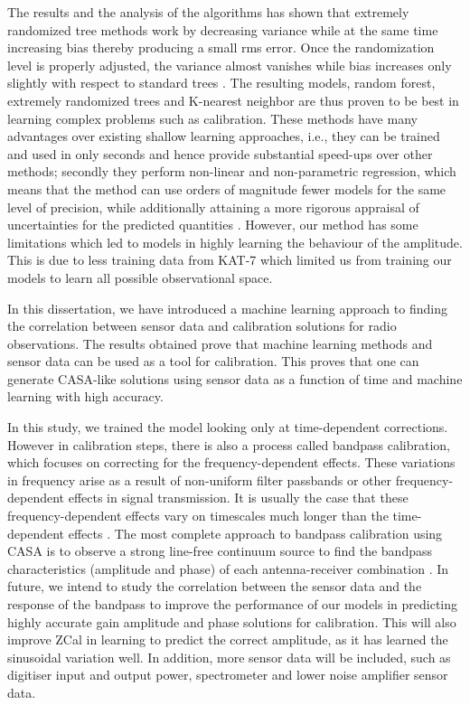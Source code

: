 The results and the analysis of the algorithms  has shown that extremely randomized tree methods work by decreasing variance while at the same time increasing bias thereby producing a small rms error. Once the randomization level is properly adjusted, the variance almost vanishes while bias increases only slightly with respect to standard trees \citep{geurts2006extremely}. The resulting models, random forest, extremely randomized trees and K-nearest neighbor are thus proven to be best in learning complex problems such as calibration. These methods have many advantages over
existing shallow learning approaches, i.e., they can be trained
and used in only seconds and hence provide substantial
speed-ups over other methods; secondly they perform non-linear and non-parametric regression, which means that the method can
use orders of magnitude fewer models for the same level
of precision, while additionally attaining a more rigorous
appraisal of uncertainties for the predicted quantities \citep{bellinger2016fundamental}. However, our method has some limitations which led to models in highly learning the behaviour of the amplitude. This is due to less training data from KAT-7 which limited us from training our models to learn all possible observational space.

In this dissertation, we have introduced a machine learning approach to finding the correlation between sensor data and calibration solutions for radio observations. The results obtained prove that machine learning  methods  and sensor data can be used as a tool for calibration. This proves that one can generate CASA-like solutions using sensor data as a function of time and machine learning with high accuracy.

In this study, we trained the model looking only at time-dependent corrections. However in calibration steps, there is also a process called bandpass calibration, which focuses on correcting for the frequency-dependent effects. These variations in frequency arise as a result of non-uniform filter passbands or other frequency-dependent effects in signal transmission. It is usually the case that these frequency-dependent effects vary on timescales much longer than the time-dependent effects \citep{editioncasa}. The most complete approach to bandpass calibration using CASA is to observe a strong line-free continuum source to find the bandpass characteristics (amplitude and phase) of each antenna-receiver combination \citep{editioncasa}. In future, we intend to study the correlation between the sensor data and the response of the bandpass to improve the performance of our models in predicting highly accurate gain amplitude and phase solutions for calibration. This will also improve ZCal in learning to predict the correct amplitude, as it has learned the sinusoidal variation well. In addition, more sensor data will be included, such as digitiser input and output power, spectrometer and lower noise amplifier sensor data.  









